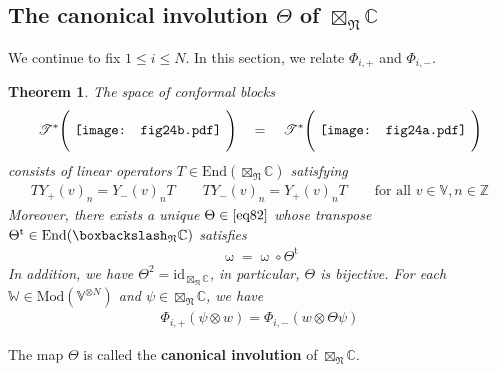 \documentclass[11pt,b5paper,notitlepage]{article}
\theoremstyle{definition}
\theoremstyle{plain}
\newtheorem{thm}[df]{Theorem}
\newcommand{\tr}{\mathrm{t}} %
\newcommand{\End}{\mathrm{End}} %
\newcommand{\Vbb}{\mathbb V}
\newcommand{\Wbb}{\mathbb W}
\newcommand{\Cbb}{\mathbb C}
\newcommand{\Zbb}{\mathbb Z}
\newcommand{\<}{\left\langle}
\renewcommand{\>}{\right\rangle}
\newcommand{\ST}{\mathscr{T}}
\newcommand{\bbs}{\boxbackslash}
\newcommand{\Mod}{\mathrm{Mod}}
\newcommand{\id}{\mathrm{id}}
\newcommand{\fn}{\mathfrak{N}}
\numberwithin{equation}{section}
\begin{document}
\subsection{The canonical involution $\Theta$ of $\boxtimes_\fn\Cbb$}



We continue to fix $1\leq i\leq N$. In this section, we relate $\Phi_{i,+}$ and $\Phi_{i,-}$.


\begin{thm}\label{lb62}
The space of conformal blocks
\begin{align}\label{eq82}
\ST^*\Bigg(\vcenter{\hbox{{
				   \texttt{[image: fig24b.pdf]}}}}~\Bigg)\quad=\quad
\ST^*\Bigg(\vcenter{\hbox{{
				   \texttt{[image: fig24a.pdf]}}}}~\Bigg)
\end{align}
consists of linear operators $T\in\End(\boxtimes_\fn\Cbb)$ satisfying
\begin{gather}\label{eq84}
TY_+(v)_n=Y_-(v)_nT\qquad TY_-(v)_n=Y_+(v)_nT\qquad\text{for all }v\in\Vbb,n\in\Zbb
\end{gather}
Moreover, there exists a unique $\Theta\in\eqref{eq82}$ whose transpose $\Theta^\tr\in\End(\bbs_\fn\Cbb)$ satisfies
\begin{align}\label{eq86}
\upomega=\upomega\circ\Theta^\tr
\end{align}
In addition, we have $\Theta^2=\id_{\boxtimes_\fn\Cbb}$, in particular, $\Theta$ is bijective. For each $\Wbb\in\Mod(\Vbb^{\otimes N})$ and $\psi\in\boxtimes_\fn\Cbb$, we have
\begin{align}\label{eq88}
\Phi_{i,+}(\psi\otimes w)=\Phi_{i,-}(w\otimes\Theta\psi)
\end{align}
\end{thm}

The map $\Theta$ is called the \textbf{canonical involution}  of $\boxtimes_\fn\Cbb$.
\end{document}
